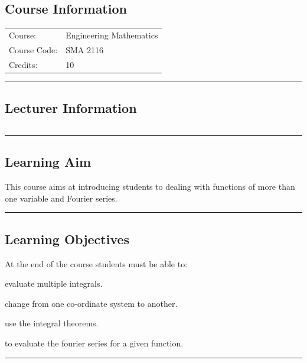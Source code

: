 
\subsection*{Course Information}\label{course:sma2116}
\vspace{0ex}%
\noindent\parbox{0.5\textwidth}{%
    \noindent\begin{tabular}{@{}ll}
                 \textsf{Course:}          & 	Engineering Mathematics \Romannum{2}\\
                 \textsf{Course Code:}         & 	SMA 2116    \\
                 \textsf{Credits:}    & 	10
    \end{tabular}}
\vspace{2ex}\hrule\vspace{2ex}

\subsection*{Lecturer Information}
\noindent\parbox{0.5\textwidth}{%
    \noindent\begin{tabular}{@{}ll}
                 
    \end{tabular}}
\vspace{2ex}\hrule\vspace{2ex}


\subsection*{Learning Aim}
This course aims at introducing students to dealing with functions of more than one variable and Fourier series.
\vspace{2ex} \hrule\vspace{2ex}

\subsection*{Learning Objectives}
At the end of the course students must be able to:
\begin{outline}
    \1 evaluate multiple integrals.

    \1 change from one co-ordinate system to another.

    \1 use the integral theorems.

    \1 to evaluate the fourier series for a given function.

\end{outline}
\vspace{2ex}\hrule\vspace{2ex}

